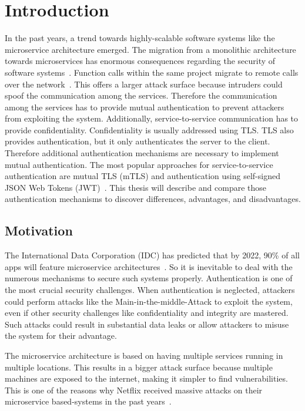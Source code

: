 \chapter{Introduction}
\label{cha:Introduction}
In the past years, a trend towards highly-scalable software systems like the microservice architecture emerged.
The migration from a monolithic architecture towards microservices has enormous consequences regarding the security of software systems~\cite{shmeleva2020microservices}. 
Function calls within the same project migrate to remote calls over the network~\cite{chandramouli2019microservices}. 
This offers a larger attack surface because intruders could spoof the communication among the services.
Therefore the communication among the services has to provide mutual authentication to prevent attackers from exploiting the system.
Additionally, service-to-service communication has to provide confidentiality.
Confidentiality is usually addressed using TLS.
TLS also provides authentication, but it only authenticates the server to the client.
Therefore additional authentication mechanisms are necessary to implement mutual authentication.
The most popular approaches for service-to-service authentication are mutual TLS (mTLS) and authentication using self-signed JSON Web Tokens (JWT)~\cite{dias2020microservices}.
This thesis will describe and compare those authentication mechanisms to discover differences, advantages, and disadvantages.

\section{Motivation}
The International Data Corporation (IDC) has predicted that by 2022, 90\% of all apps will feature microservice architectures~\cite{idcprediction2019}. 
So it is inevitable to deal with the numerous mechanisms to secure such systems properly. 
Authentication is one of the most crucial security challenges.
When authentication is neglected, attackers could perform attacks like the Main-in-the-middle-Attack to exploit the system, even if other security challenges like confidentiality and integrity are mastered.
Such attacks could result in substantial data leaks or allow attackers to misuse the system for their advantage.

The microservice architecture is based on having multiple services running in multiple locations.
This results in a bigger attack surface because multiple machines are exposed to the internet, making it simpler to find vulnerabilities.
This is one of the reasons why Netflix received massive attacks on their microservice based-systems in the past years~\cite{pereira2019security}.

